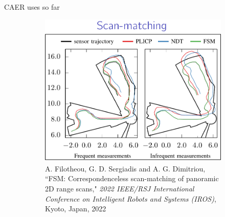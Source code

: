 \begin{frame}[noframenumbering]{CAER uses so far}

  \vspace{-0.6cm}
  \begin{figure}
    \centering
    \begin{subfigure}[t]{0.5\textwidth}
      \centering
      \includegraphics[scale=0.2]{./figures/07/fsm.png}
      \caption{\tiny A. Filotheou, G. D. Sergiadis and A. G. Dimitriou, ``FSM: Correspondenceless scan-matching of panoramic 2D range scans," \textit{2022 IEEE/RSJ International Conference on Intelligent Robots and Systems (IROS)}, Kyoto, Japan, 2022}
      \label{a}
    \end{subfigure}%
    \begin{subfigure}[t]{0.5\textwidth}
      \centering

\end{subfigure}
\end{figure}
\end{frame}
